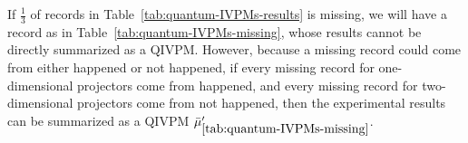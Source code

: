 \documentclass[english,reprint, aps, prl,superscriptaddress, showpacs,
showkeys, longbibliography, amsmath, amssymb, floatfix]{revtex4-1}
\theoremstyle{plain}
\theoremstyle{definition}
\begin{document}
If $\frac{1}{3}$ of records in Table~\ref{tab:quantum-IVPMs-results}
is missing, we will have a record as in Table~\ref{tab:quantum-IVPMs-missing},
whose results cannot be directly summarized as a QIVPM. However, because
a missing record could come from either happened or not happened,
if every missing record for one-dimensional projectors come from happened,
and every missing record for two-dimensional projectors come from
not happened, then the experimental results can be summarized as a
QIVPM $\bar{\mu}_{\ref{tab:quantum-IVPMs-missing}}'$.


\end{document}
